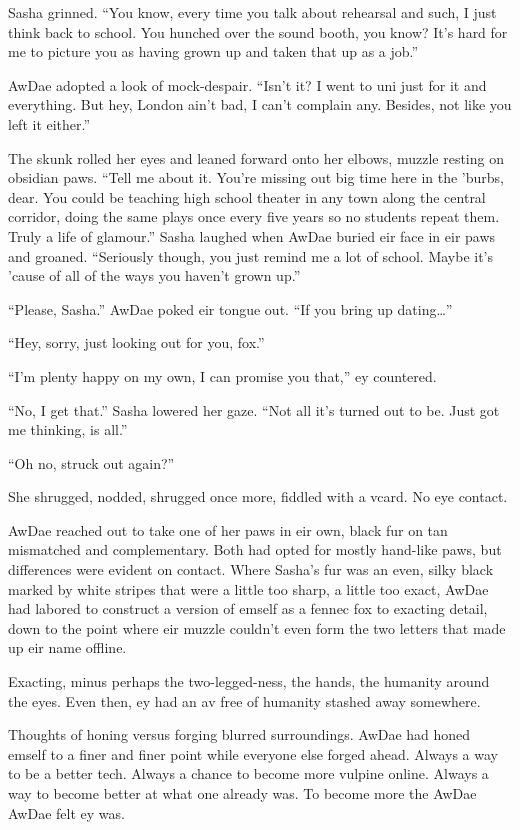Sasha grinned. ``You know, every time you talk about rehearsal and such, I just think back to school. You hunched over the sound booth, you know? It's hard for me to picture you as having grown up and taken that up as a job.''

AwDae adopted a look of mock-despair. ``Isn't it? I went to uni just for it and everything. But hey, London ain't bad, I can't complain any. Besides, not like you left it either.''

The skunk rolled her eyes and leaned forward onto her elbows, muzzle resting on obsidian paws. ``Tell me about it. You're missing out big time here in the 'burbs, dear. You could be teaching high school theater in any town along the central corridor, doing the same plays once every five years so no students repeat them. Truly a life of glamour.'' Sasha laughed when AwDae buried eir face in eir paws and groaned. ``Seriously though, you just remind me a lot of school. Maybe it's 'cause of all of the ways you haven't grown up.''

``Please, Sasha.'' AwDae poked eir tongue out. ``If you bring up dating\ldots{}''

``Hey, sorry, just looking out for you, fox.''

``I'm plenty happy on my own, I can promise you that,'' ey countered.

``No, I get that.'' Sasha lowered her gaze. ``Not all it's turned out to be. Just got me thinking, is all.''

``Oh no, struck out again?''

She shrugged, nodded, shrugged once more, fiddled with a vcard. No eye contact.

AwDae reached out to take one of her paws in eir own, black fur on tan mismatched and complementary. Both had opted for mostly hand-like paws, but differences were evident on contact. Where Sasha's fur was an even, silky black marked by white stripes that were a little too sharp, a little too exact, AwDae had labored to construct a version of emself as a fennec fox to exacting detail, down to the point where eir muzzle couldn't even form the two letters that made up eir name offline.

Exacting, minus perhaps the two-legged-ness, the hands, the humanity around the eyes. Even then, ey had an av free of humanity stashed away somewhere.

Thoughts of honing versus forging blurred surroundings. AwDae had honed emself to a finer and finer point while everyone else forged ahead. Always a way to be a better tech. Always a chance to become more vulpine online. Always a way to become better at what one already was. To become more the AwDae AwDae felt ey was.

